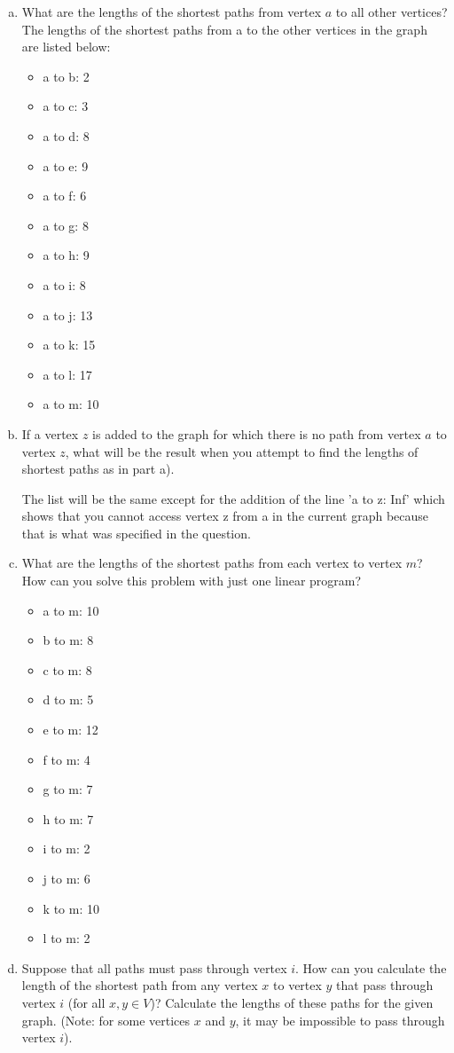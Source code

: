 \documentclass[../main.tex]{subfiles}
\begin{document}
\begin{enumerate}[a)]
	\item What are the lengths of the shortest paths from vertex $a$ to all other vertices?
    The lengths of the shortest paths from a to the other vertices in the graph are listed below:
    \begin{itemize}
        \item a to b: 2
        \item a to c: 3
        \item a to d: 8
        \item a to e: 9
        \item a to f: 6
        \item a to g: 8
        \item a to h: 9
        \item a to i: 8
        \item a to j: 13
        \item a to k: 15
        \item a to l: 17
        \item a to m: 10
    \end{itemize}
	\item If a vertex $z$ is added to the graph for which there is no path from vertex $a$ to vertex $z$, what will be the result when you attempt to find the lengths of shortest paths as in part a).

The list will be the same except for the addition of the line 'a to z: Inf' which shows that you cannot access vertex z from a in the current graph because that is what was specified in the question.

	\item What are the lengths of the shortest paths from each vertex to vertex $m$? How can you solve this problem with just one linear program?

  \begin{itemize}
      \item a to m: 10
      \item b to m: 8
      \item c to m: 8
      \item d to m: 5
      \item e to m: 12
      \item f to m: 4
      \item g to m: 7
      \item h to m: 7
      \item i to m: 2
      \item j to m: 6
      \item k to m: 10
      \item l to m: 2
  \end{itemize}

	\item Suppose that all paths must pass through vertex $i$. How can you calculate the length of the shortest path from any vertex $x$ to vertex $y$ that pass through vertex $i$ (for all $x, y \in V$)? Calculate the lengths of these paths for the given graph. (Note: for some vertices $x$ and $y$, it may be impossible to pass through vertex $i$).
\end{enumerate}
\end{document}
